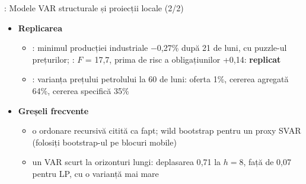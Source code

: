 \begin{frame}{: Modele VAR structurale și proiecții locale (2/2)}
\itemsize{\small}
\begin{itemize}
    \item \textbf{Replicarea}
    \begin{itemize}
        \item {}: minimul producției industriale \ensuremath{-}0{,}27\% după 21 de luni, cu puzzle-ul prețurilor; : $F$ = 17{,}7, prima de risc a obligațiunilor +0{,}14: \textbf{replicat}
        \item {}: varianța prețului petrolului la 60 de luni: oferta 1\%, cererea agregată 64\%, cererea specifică 35\%
    \end{itemize}
    \item \textbf{Greșeli frecvente}
    \begin{itemize}
        \item o ordonare recursivă citită ca fapt; wild bootstrap pentru un proxy SVAR (folosiți bootstrap-ul pe blocuri mobile)
        \item un VAR scurt la orizonturi lungi: deplasarea 0{,}71 la $h = 8$, față de 0{,}07 pentru LP, cu o varianță mai mare
    \end{itemize}
\end{itemize}
\end{frame}

